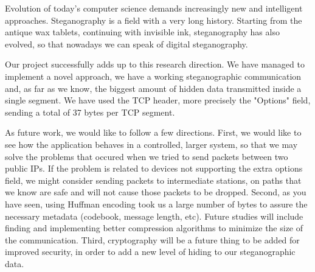 
Evolution of today's computer science demands increasingly new and intelligent
approaches. Steganography is a field with a very long history. Starting from
the antique wax tablets, continuing with invisible ink, steganography has also
evolved, so that nowadays we can speak of digital steganography.

Our project successfully adds up to this research direction. We have managed to
implement a novel approach, we have a working steganographic communication and,
as far as we know, the biggest amount of hidden data transmitted inside a
single segment. We have used the TCP header, more precisely the "Options"
field, sending a total of 37 bytes per TCP segment.

As future work, we would like to follow a few directions. First, we would like to
see how the application behaves in a controlled, larger system, so that we may solve
the problems that occured when we tried to send packets between two public IPs. If
the problem is related to devices not supporting the extra options field, we might 
consider sending packets to intermediate stations, on paths that we know are safe
and will not cause those packets to be dropped. Second, as you have seen, using
Huffman encoding took us a large number of bytes to assure the necessary metadata
(codebook, message length, etc). Future studies will include finding and
implementing better compression algorithms to minimize the size of the
communication. Third, cryptography will be a future thing to be added for
improved security, in order to add a new level of hiding to our steganographic data.
